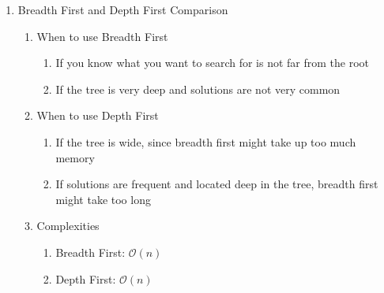 \documentclass [12pt, executivepaper]{article}
\begin{document}
\begin{enumerate}
\begin{enumerate}
\begin{enumerate}
\end{enumerate}

\end{enumerate}

\item Breadth First and Depth First Comparison

\begin{enumerate}

\item When to use Breadth First

\begin{enumerate}

\item If you know what you want to search for is not far from the root

\item If the tree is very deep and solutions are not very common 

\end{enumerate}

\item When to use Depth First

\begin{enumerate}

\item If the tree is wide, since breadth first might take up too much memory

\item If solutions are frequent and located deep in the tree, breadth first might take too long

\end{enumerate}

\item Complexities

\begin{enumerate}

\item Breadth First: $\mathcal{O}(n)$

\item Depth First: $\mathcal{O}(n)$

\end{enumerate}

\end{enumerate}

\end{enumerate}
\end{document}
